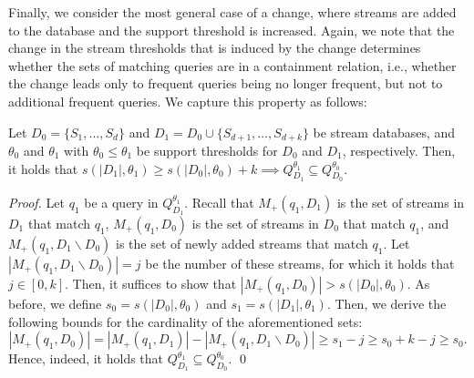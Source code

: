 Finally, we consider the most general case of a
change, where streams are added to the database and
the support threshold is increased. Again, we note
that the change in the stream thresholds that is
induced by the change determines whether the sets of
matching queries are in a containment relation, i.e.,
whether the change leads only to frequent queries
being no longer frequent, but not to additional
frequent queries. We capture this property as follows:
\begin{lemma}
    \label{lemma:update}
    Let $D_0=\{S_1,\dots,S_d\}$ and
    $D_1=D_0 \cup \{S_{d+1}, \dots, S_{d+k}\}$
    be stream databases, and $\theta_0$ and $\theta_1$
    with $\theta_0 \leq \theta_1$ be support
    thresholds for $D_0$ and $D_1$, respectively.
    Then, it holds that $s(|D_1|,\theta_1) \geq
    s(|D_0|,\theta_0) + k \implies Q_{D_1}^{\theta_1}
    \subseteq Q_{D_0}^{\theta_0}$.
\end{lemma}
\textit{Proof.}
Let $q_1$ be a query in $Q_{D_1}^{\theta_1}$. Recall
that $M_+(q_1,D_1)$ is the set of streams in $D_1$
that match $q_1$, $M_+(q_1,D_0)$ is the set of streams
in $D_0$ that match $q_1$, and $M_+(q_1,D_1\backslash
D_0)$ is the set of newly added streams that match
$q_1$. Let $|M_+(q_1,D_1\backslash D_0)|= j$ be the
number of these streams, for which it holds that $j\in
[0,k]$. Then, it suffices to show that $|M_+(q_1,D_0)|
> s(|D_0|,\theta_0)$. As before, we define $s_0 =
s(|D_0|,\theta_0)$ and $s_1 = s(|D_1|,\theta_1)$.
Then, we derive the following bounds for the
cardinality of the aforementioned sets:
$$|M_+(q_1,D_0)| = |M_+(q_1,D_1)| -
|M_+(q_1,D_1\backslash D_0)| \geq s_1 - j \geq s_0 + k
- j \geq s_0.$$
Hence, indeed, it holds that $Q_{D_1}^{\theta_1}
\subseteq Q_{D_0}^{\theta_0}$. \hfill  \qed


